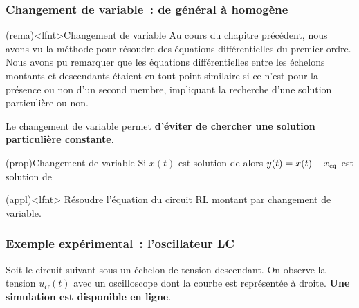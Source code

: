 \documentclass[../../main/main.tex]{subfiles}
\begin{document}
\subsubsection{Changement de variable~: de général à homogène}
\begin{tcb}[label=demo:chvar](rema)<lfnt>{Changement de variable}
	Au cours du chapitre précédent, nous avons vu la méthode pour résoudre
	des équations différentielles du premier ordre. Nous avons pu remarquer
	que les équations différentielles entre les échelons montants et
	descendants étaient en tout point similaire si ce n'est pour la présence
	ou non d'un second membre, impliquant la recherche d'une solution
	particulière ou non.

	Le changement de variable permet \textbf{d'éviter de
		chercher une solution particulière constante}.
\end{tcb}
\begin{tcb}[label=prop:chvar](prop){Changement de variable}
	Si $x(t)$ est solution de
	\psw{
	\[
		\boxed{ \dv[2]{x}{t} + \w_0{}^2x = \w_0{}^2x_{\rm eq}}
	\]
	}
	alors $y(t) = x(t) - x_{\rm eq}$ est solution de
	\psw{
		\[
			\boxed{ \dv[2]{y}{t} + \w_0{}^2y = 0}
		\]
	}
\end{tcb}
\begin{tcb}(appl)<lfnt>{}
	Résoudre l'équation du circuit RL montant par changement de variable.
	\tcblower
	\vspace{-15pt}
\end{tcb}

\subsubsection{Exemple expérimental~: l'oscillateur LC}

Soit le circuit suivant sous un échelon de tension descendant. On observe la
tension $u_C(t)$ avec un oscilloscope dont la courbe est représentée à droite.
\textbf{Une simulation est disponible en
	ligne}.
\end{document}
